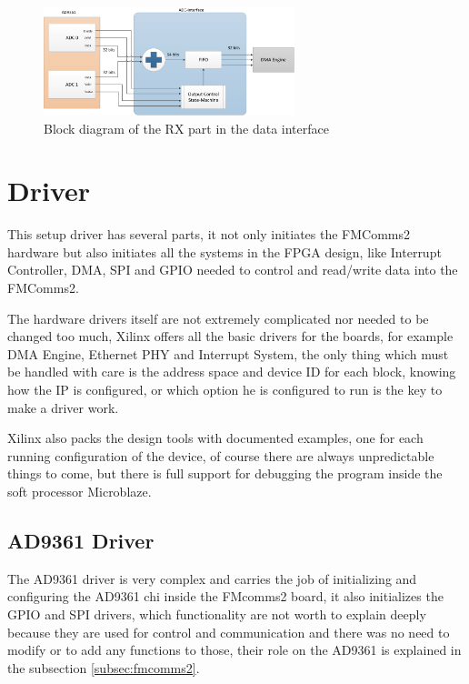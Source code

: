 \begin{figure}[htbp]
    \centering
    \includegraphics[width=0.65\textwidth]{./figures/rxdata_if}
    \caption{ Block diagram of the RX part in the data interface
    \label{fig:dataifrx}}
\end{figure}

\section{Driver}
\label{impl:driver}

This setup driver has several parts, it not only initiates the FMComms2 hardware
but also initiates all the systems in the FPGA design, like Interrupt Controller,
 DMA, SPI and GPIO needed to control and read/write data into the FMComms2.

The hardware drivers itself are not extremely complicated nor needed to be changed
too much, Xilinx offers all the basic drivers for the boards, for example DMA Engine,
Ethernet PHY and Interrupt System, the only thing which must be handled with care is
the address space and device ID for each block, knowing how the IP is configured,
or which option he is configured to run is the key to make a driver work.

Xilinx also packs the design tools with documented examples, one for each running
configuration of the device, of course there are always unpredictable things to come,
but there is full support for debugging the program inside the soft processor
Microblaze.

\subsection{AD9361 Driver}

The AD9361 driver is very complex and carries the job of initializing and
configuring the AD9361 chi inside the FMcomms2 board, it also initializes the
GPIO and SPI drivers, which functionality are not worth to explain deeply
because they are used for control and communication and there was no need to
modify or to add any functions to those, their role on the AD9361 is explained
in the subsection \ref{subsec:fmcomms2}.

